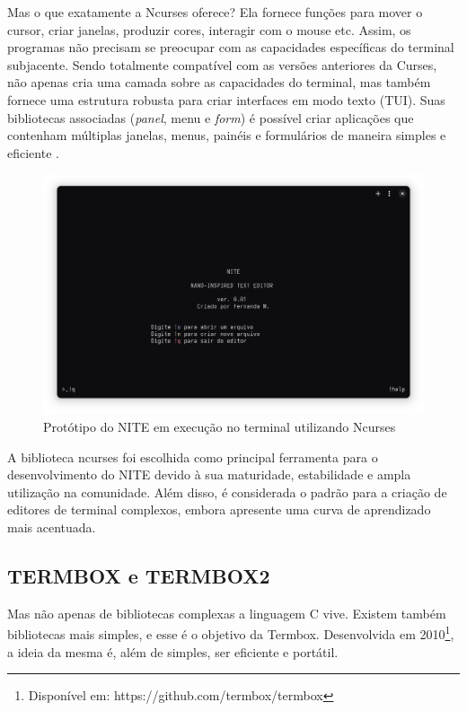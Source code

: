 Mas o que exatamente a Ncurses oferece? Ela fornece funções para mover o cursor,
criar janelas, produzir cores, interagir com o mouse etc. Assim, os programas
não precisam se preocupar com as capacidades específicas do terminal subjacente.
Sendo totalmente compatível com as versões anteriores da Curses, não apenas cria
uma camada sobre as capacidades do terminal, mas também fornece uma estrutura robusta
para criar interfaces em modo texto (TUI). Suas bibliotecas associadas (\textit{panel},
menu e \textit{form}) é possível criar aplicações que contenham múltiplas janelas,
menus, painéis e formulários de maneira simples e eficiente \cite{ncurses_howto}.

\FloatBarrier
\begin{figure}[!htbp]
    \centering
    \caption{Protótipo do NITE em execução no terminal utilizando Ncurses}
    \includegraphics[scale=0.3]{imagens/NITE.png}
\end{figure}
\FloatBarrier

A biblioteca ncurses foi escolhida como principal ferramenta para o
desenvolvimento do NITE devido à sua maturidade, estabilidade e ampla utilização
na comunidade. Além disso, é considerada o padrão para a criação de editores de terminal
complexos, embora apresente uma curva de aprendizado mais acentuada.

\subsection{TERMBOX e TERMBOX2}

Mas não apenas de bibliotecas complexas a linguagem C vive. Existem também
bibliotecas mais simples, e esse é o objetivo da Termbox. Desenvolvida em 2010\footnote{Disponível
em: https://github.com/termbox/termbox}, a ideia da mesma é, além de simples,
ser eficiente e portátil.

